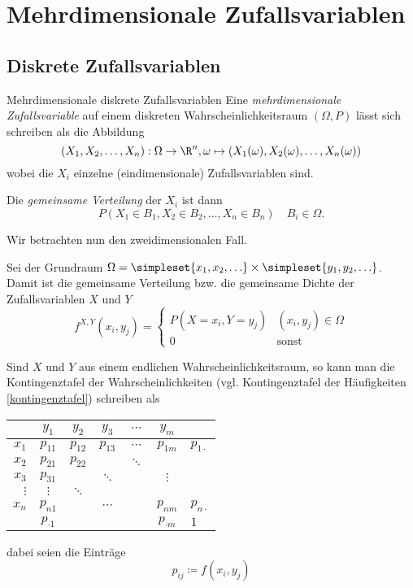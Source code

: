 \chapter{Mehrdimensionale Zufallsvariablen}
\section{Diskrete Zufallsvariablen}
\begin{definition}{Mehrdimensionale diskrete Zufallsvariablen}
	Eine \emph{mehrdimensionale Zufallsvariable} auf einem diskreten Wahrscheinlichkeitsraum $(\Omega,P)$ lässt sich schreiben als die Abbildung
	\begin{equation*}
		(X_1,X_2,\ldots,X_n):\Omega\rightarrow \R^n, \omega\mapsto (X_1(\omega),X_2(\omega),\ldots,X_n(\omega))
	\end{equation*}
	wobei die $X_i$ einzelne (eindimensionale) Zufallsvariablen sind.

	Die \emph{gemeinsame Verteilung} der $X_i$ ist dann
	\begin{equation*}
		P(X_1\in B_1,X_2\in B_2, \ldots, X_n\in B_n) \quad B_i\in\Omega.
	\end{equation*}
\end{definition}

Wir betrachten nun den zweidimensionalen Fall.

Sei der Grundraum $\Omega=\simpleset{x_1,x_2,\ldots}\times\simpleset{y_1,y_2,\ldots}$.
Damit ist die gemeinsame Verteilung bzw. die gemeinsame Dichte der Zufallsvariablen $X$ und $Y$
\begin{equation*} 
	f^{X,Y}(x_i,y_j)=\begin{cases}
	P(X=x_i,Y=y_j)&(x_i,y_j)\in\Omega\\
	0&\text{sonst}
	\end{cases}
\end{equation*}

Sind $X$ und $Y$ aus einem endlichen Wahrscheinlichkeitsraum, so kann man die Kontingenztafel der Wahrscheinlichkeiten (vgl. Kontingenztafel der Häufigkeiten \autoref{kontingenztafel}) schreiben als
\begin{center}
	\begin{tabular}{r|ccccc|l}
		&$y_1$&$y_2$&$y_3$&$\cdots$&$y_m$&\\\hline
		$x_1$&$p_{11}$&$p_{12}$&$p_{13}$&$\cdots$&$p_{1m}$&$p_{1\cdot}$\\
		$x_2$&$p_{21}$&$p_{22}$&&$\ddots$&&\\
		$x_3$&$p_{31}$&&$\ddots$&&$\vdots$&\\
		$\vdots$&$\vdots$&$\ddots$&&&&\\
		$x_n$&$p_{n1}$&&$\cdots$&&$p_{nm}$&$p_{n\cdot}$\\\hline
		&$p_{\cdot1}$&&&&$p_{\cdot m}$&$1$
	\end{tabular}
\end{center}
dabei seien die Einträge
\begin{equation*}
	p_{ij}\coloneqq f(x_i,y_j)
\end{equation*}

